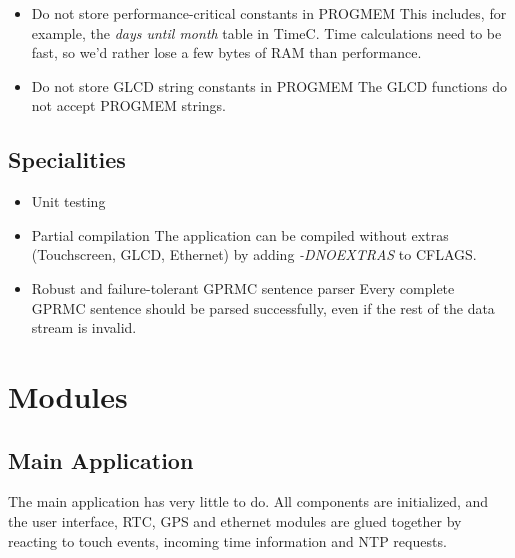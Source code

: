 \documentclass[12pt,a4paper,titlepage,oneside]{article}
\begin{document}
\begin{itemize}
\item Do not store performance-critical constants in PROGMEM
    This includes, for example, the \emph{days until month} table in TimeC.
    Time calculations need to be fast, so we'd rather lose a few bytes of RAM
    than performance.

\item Do not store GLCD string constants in PROGMEM
    The GLCD functions do not accept PROGMEM strings.
 
\end{itemize}


\subsection{Specialities}

\begin{itemize}

\item Unit testing

\item Partial compilation
    The application can be compiled without extras (Touchscreen, GLCD,
    Ethernet) by adding \emph{-DNOEXTRAS} to CFLAGS.

\item Robust and failure-tolerant GPRMC sentence parser
    Every complete GPRMC sentence should be parsed successfully, even if the
    rest of the data stream is invalid.
 
\end{itemize}


\section{Modules}

\subsection{Main Application}

The main application has very little to do. All components are initialized, and
the user interface, RTC, GPS and ethernet modules are glued together by
reacting to touch events, incoming time information and NTP requests.
\end{document}
